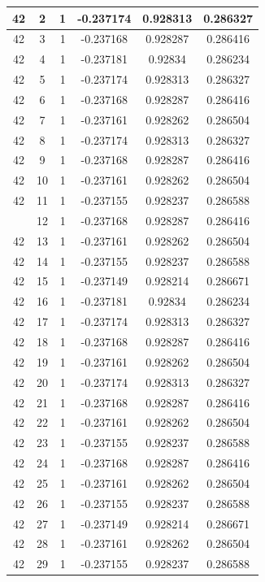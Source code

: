 \documentclass[12pt,a4paper]{article}
\numberwithin{equation}{section}
\numberwithin{figure}{section}
\numberwithin{table}{section}
\begin{document}
\begin{longtable}{|c|c|c|c|c|c|}
42 & 2 & 1 & -0.237174 & 0.928313 & 0.286327 \\ \hline
42 & 3 & 1 & -0.237168 & 0.928287 & 0.286416 \\ \hline
42 & 4 & 1 & -0.237181 & 0.92834 & 0.286234 \\ \hline
42 & 5 & 1 & -0.237174 & 0.928313 & 0.286327 \\ \hline
42 & 6 & 1 & -0.237168 & 0.928287 & 0.286416 \\ \hline
42 & 7 & 1 & -0.237161 & 0.928262 & 0.286504 \\ \hline
42 & 8 & 1 & -0.237174 & 0.928313 & 0.286327 \\ \hline
42 & 9 & 1 & -0.237168 & 0.928287 & 0.286416 \\ \hline
42 & 10 & 1 & -0.237161 & 0.928262 & 0.286504 \\ \hline
42 & 11 & 1 & -0.237155 & 0.928237 & 0.286588 \\ \hline
\pagebreak
42 & 12 & 1 & -0.237168 & 0.928287 & 0.286416 \\ \hline
42 & 13 & 1 & -0.237161 & 0.928262 & 0.286504 \\ \hline
42 & 14 & 1 & -0.237155 & 0.928237 & 0.286588 \\ \hline
42 & 15 & 1 & -0.237149 & 0.928214 & 0.286671 \\ \hline
42 & 16 & 1 & -0.237181 & 0.92834 & 0.286234 \\ \hline
42 & 17 & 1 & -0.237174 & 0.928313 & 0.286327 \\ \hline
42 & 18 & 1 & -0.237168 & 0.928287 & 0.286416 \\ \hline
42 & 19 & 1 & -0.237161 & 0.928262 & 0.286504 \\ \hline
42 & 20 & 1 & -0.237174 & 0.928313 & 0.286327 \\ \hline
42 & 21 & 1 & -0.237168 & 0.928287 & 0.286416 \\ \hline
42 & 22 & 1 & -0.237161 & 0.928262 & 0.286504 \\ \hline
42 & 23 & 1 & -0.237155 & 0.928237 & 0.286588 \\ \hline
42 & 24 & 1 & -0.237168 & 0.928287 & 0.286416 \\ \hline
42 & 25 & 1 & -0.237161 & 0.928262 & 0.286504 \\ \hline
42 & 26 & 1 & -0.237155 & 0.928237 & 0.286588 \\ \hline
42 & 27 & 1 & -0.237149 & 0.928214 & 0.286671 \\ \hline
42 & 28 & 1 & -0.237161 & 0.928262 & 0.286504 \\ \hline
42 & 29 & 1 & -0.237155 & 0.928237 & 0.286588 \\ \hline

\end{longtable}
\end{document}
